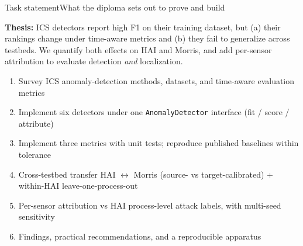 \documentclass[aspectratio=169,11pt]{beamer}
\begin{document}
\begin{frame}{Task statement}{What the diploma sets out to prove and build}
\begin{block}{}
{\color{teal}\bfseries Thesis:} ICS detectors report high F1 on their training dataset, but (a) their rankings change under time-aware metrics and (b) they fail to generalize across testbeds. We quantify both effects on HAI and Morris, and add per-sensor attribution to evaluate detection \emph{and} localization.
\end{block}
\begin{enumerate}\small\itemsep2pt
  \item Survey ICS anomaly-detection methods, datasets, and time-aware evaluation metrics
  \item Implement six detectors under one \texttt{AnomalyDetector} interface (fit / score / attribute)
  \item Implement three metrics with unit tests; reproduce published baselines within tolerance
  \item Cross-testbed transfer HAI $\leftrightarrow$ Morris (source- vs target-calibrated) + within-HAI leave-one-process-out
  \item Per-sensor attribution vs HAI process-level attack labels, with multi-seed sensitivity
  \item Findings, practical recommendations, and a reproducible apparatus
\end{enumerate}
\end{frame}
\end{document}
